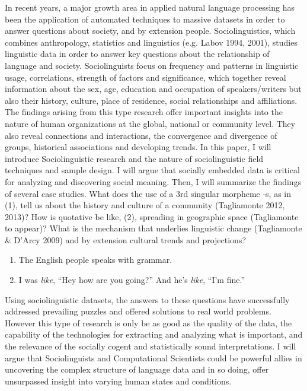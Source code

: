 In recent years, a major growth area in applied natural language processing has been the application of automated techniques to massive datasets in order to answer questions about society, and by extension people. Sociolinguistics, which combines anthropology, statistics and linguistics (e.g. Labov 1994, 2001), studies linguistic data in order to answer key questions about the relationship of language and society. Sociolinguists focus on frequency and patterns in linguistic usage, correlations, strength of factors and significance, which together reveal information about the sex, age, education and occupation of speakers/writers but also their history, culture, place of residence, social relationships and affiliations. The findings arising from this type research offer important insights into the nature of human organizations at the global, national or community level. They also reveal connections and interactions, the convergence and divergence of groups, historical associations and developing trends. In this paper, I will introduce Sociolinguistic research and the nature of sociolinguistic field techniques and sample design. I will argue that socially embedded data is critical for analyzing and discovering social meaning. Then, I will summarize the findings of several case studies. What does the use of a 3rd singular morpheme -s, as in (1), tell us about the history and culture of a community (Tagliamonte 2012, 2013)? How is quotative be like, (2), spreading in geographic space (Tagliamonte to appear)? What is the mechanism that underlies linguistic change (Tagliamonte \\& D'Arcy 2009) and by extension cultural trends and projections? \begin{enumerate} \item The English people speaks with grammar. \item I was \emph{like}, ``Hey how are you going?'' And he's \emph{like}, ``I'm fine.'' \end{enumerate} Using sociolinguistic datasets, the answers to these questions have successfully addressed prevailing puzzles and offered solutions to real world problems. However this type of research is only be as good as the quality of the data, the capability of the technologies for extracting and analyzing what is important, and the relevance of the socially cogent and statistically sound interpretations. I will argue that Sociolinguists and Computational Scientists could be powerful allies in uncovering the complex structure of language data and in so doing, offer unsurpassed insight into varying human states and conditions.
